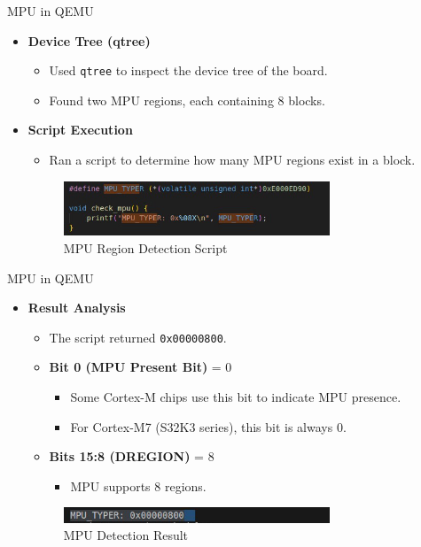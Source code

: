 \begin{frame}{MPU in QEMU}
    \begin{itemize}
        \item \textbf{Device Tree (qtree)}
        \begin{itemize}
            \item Used \texttt{qtree} to inspect the device tree of the board.
            \item Found two MPU regions, each containing 8 blocks.
        \end{itemize}
        \item \textbf{Script Execution}
        \begin{itemize}
            \item Ran a script to determine how many MPU regions exist in a block.
        \end{itemize}
        \begin{figure}[h]
            \centering
            \includegraphics[width=0.75\textwidth]{images/mpu_qemu_1.png}
            \caption{MPU Region Detection Script}
        \end{figure}
    \end{itemize}
\end{frame}

\begin{frame}{MPU in QEMU}
    \begin{itemize}
        \item \textbf{Result Analysis}
        \begin{itemize}
            \item The script returned \texttt{0x00000800}.
            \item \textbf{Bit 0 (MPU Present Bit)} = 0 
            \begin{itemize}
                \item Some Cortex-M chips use this bit to indicate MPU presence.
                \item For Cortex-M7 (S32K3 series), this bit is always 0. 
            \end{itemize}
            \item \textbf{Bits 15:8 (DREGION)} = 8  
            \begin{itemize}
                \item MPU supports 8 regions.
            \end{itemize}
        \end{itemize}
        \begin{figure}[h]
            \centering
            \includegraphics[width=0.75\textwidth]{images/mpu_qemu_2.png}
            \caption{MPU Detection Result}
        \end{figure}
    \end{itemize}
\end{frame}